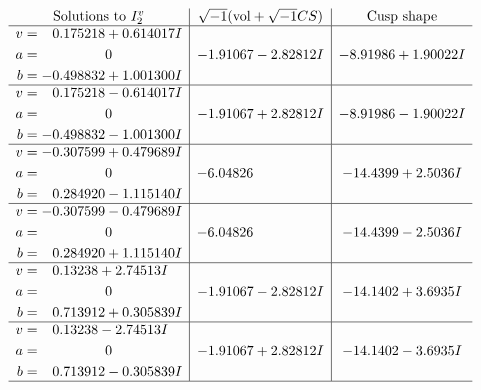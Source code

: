 \documentclass[1p]{elsarticle_modified}
\theoremstyle{definition}
\newcommand{\I}{\sqrt{-1}}
\begin{document}
$$\begin{array}{c|c|c}  
\text{Solutions to }I^v_{2}& \I (\text{vol} + \sqrt{-1}CS) & \text{Cusp shape}\\
 \hline 
\begin{aligned}
v &= \phantom{-}0.175218 + 0.614017 I \\
a &= \phantom{-0.000000 } 0 \\
b &= -0.498832 + 1.001300 I\end{aligned}
 & -1.91067 - 2.82812 I & -8.91986 + 1.90022 I \\ \hline\begin{aligned}
v &= \phantom{-}0.175218 - 0.614017 I \\
a &= \phantom{-0.000000 } 0 \\
b &= -0.498832 - 1.001300 I\end{aligned}
 & -1.91067 + 2.82812 I & -8.91986 - 1.90022 I \\ \hline\begin{aligned}
v &= -0.307599 + 0.479689 I \\
a &= \phantom{-0.000000 } 0 \\
b &= \phantom{-}0.284920 - 1.115140 I\end{aligned}
 & -6.04826\phantom{ +0.000000I} & -14.4399 + 2.5036 I \\ \hline\begin{aligned}
v &= -0.307599 - 0.479689 I \\
a &= \phantom{-0.000000 } 0 \\
b &= \phantom{-}0.284920 + 1.115140 I\end{aligned}
 & -6.04826\phantom{ +0.000000I} & -14.4399 - 2.5036 I \\ \hline\begin{aligned}
v &= \phantom{-}0.13238 + 2.74513 I \\
a &= \phantom{-0.000000 } 0 \\
b &= \phantom{-}0.713912 + 0.305839 I\end{aligned}
 & -1.91067 - 2.82812 I & -14.1402 + 3.6935 I \\ \hline\begin{aligned}
v &= \phantom{-}0.13238 - 2.74513 I \\
a &= \phantom{-0.000000 } 0 \\
b &= \phantom{-}0.713912 - 0.305839 I\end{aligned}
 & -1.91067 + 2.82812 I & -14.1402 - 3.6935 I\\
 \hline 
 \end{array}$$\newpage
\end{document}
